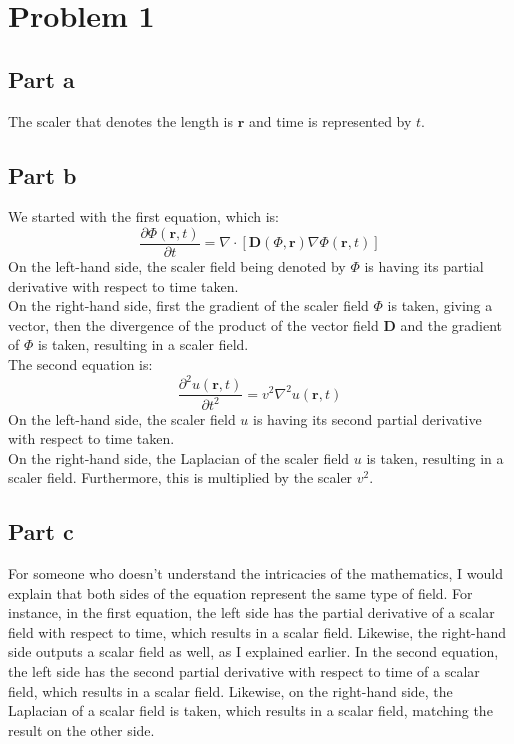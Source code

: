 \documentclass{article}
\begin{document}
\section{Problem 1}
\subsection{Part a}
The scaler that denotes the length is $\mathbf{r}$ and time is represented by $t$.
\subsection{Part b}
We started with the first equation, which is:
\begin{equation}
\frac{\partial \Phi(\mathbf{r}, t)}{\partial t} = \nabla \cdot [\mathbf{D}(\Phi, \mathbf{r}) \nabla \Phi(\mathbf{r}, t)]
\end{equation}
On the left-hand side, the scaler field being denoted by $\Phi$ is having its partial derivative with respect to time taken.\\
On the right-hand side, first the gradient of the scaler field $\Phi$ is taken, giving a vector, then the divergence of the product of the vector field $\mathbf{D}$ and the gradient of $\Phi$ is taken, resulting in a scaler field.\\
The second equation is:
\begin{equation}
    \frac{\partial^2 u(\mathbf{r}, t)}{\partial t^2} = v^2 \nabla^2 u(\mathbf{r}, t)
\end{equation}
On the left-hand side, the scaler field $u$ is having its second partial derivative with respect to time taken.\\
On the right-hand side, the Laplacian of the scaler field $u$ is taken, resulting in a scaler field. Furthermore, this is multiplied by the scaler $v^2$.
\subsection{Part c}
For someone who doesn't understand the intricacies of the mathematics, I would explain that both sides of the equation represent the same type of field. For instance, in the first equation, the left side has the partial derivative of a scalar field with respect to time, which results in a scalar field. Likewise, the right-hand side outputs a scalar field as well, as I explained earlier. In the second equation, the left side has the second partial derivative with respect to time of a scalar field, which results in a scalar field. Likewise, on the right-hand side, the Laplacian of a scalar field is taken, which results in a scalar field, matching the result on the other side.
\end{document}
